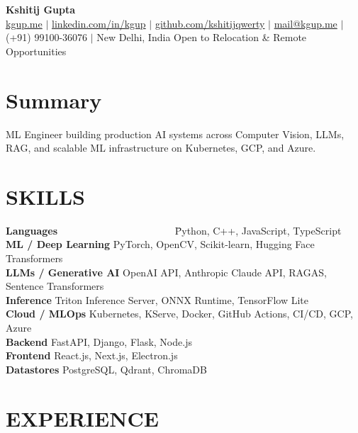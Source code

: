 \documentclass[a4paper,7.5pt]{extarticle}
\begin{document}
\pagestyle{empty}

\begin{center}
{\normalsize\textbf{Kshitij Gupta}}\\[1pt]
\small
\href{https://kgup.me}{kgup.me} $|$
\href{https://www.linkedin.com/in/kgup}{linkedin.com/in/kgup} $|$
\href{https://www.github.com/kshitijqwerty}{github.com/kshitijqwerty} $|$
\href{mailto:mail@kgup.me}{mail@kgup.me} $|$
(+91) 99100-36076 $|$
New Delhi, India \textbar{} Open to Relocation \& Remote Opportunities
\end{center}


\section*{Summary}
\small
ML Engineer building production AI systems across Computer Vision, LLMs, RAG, and scalable ML infrastructure on Kubernetes, GCP, and Azure.


\section*{SKILLS}
\small
\begin{tabbing}
\textbf{Languages}~~~~~~~~~~~~~~~~~~~~~~~ \= Python, C++, JavaScript, TypeScript \\
\textbf{ML / Deep Learning} \> PyTorch, OpenCV, Scikit-learn, Hugging Face Transformers \\
\textbf{LLMs / Generative AI} \> OpenAI API, Anthropic Claude API, RAGAS, Sentence Transformers \\
\textbf{Inference} \> Triton Inference Server, ONNX Runtime, TensorFlow Lite \\
\textbf{Cloud / MLOps} \> Kubernetes, KServe, Docker, GitHub Actions, CI/CD, GCP, Azure \\
\textbf{Backend} \> FastAPI, Django, Flask, Node.js \\
\textbf{Frontend} \> React.js, Next.js, Electron.js \\
\textbf{Datastores} \> PostgreSQL, Qdrant, ChromaDB
\end{tabbing}


\section*{EXPERIENCE}
\small
\end{document}
